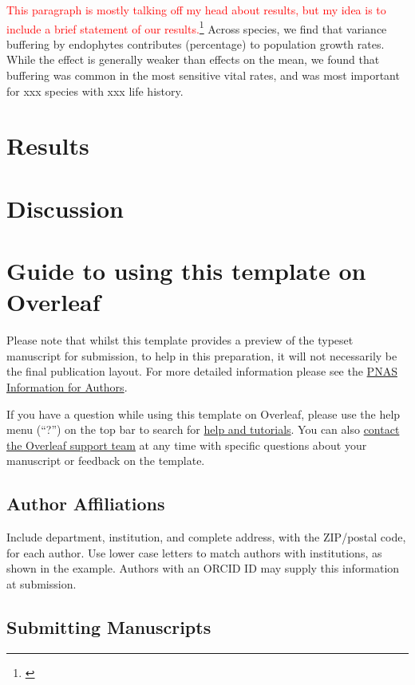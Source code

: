 \documentclass[9pt,twocolumn,twoside,lineno]{pnas-new}
\newcommand{\tom}[2]{{\color{red}{#1}}\footnote{\textit{\color{red}{#2}}}}
\begin{document}
\textcolor{red}{This paragraph is mostly talking off my head about results, but my idea is to include a brief statement of our results.\tom{}{Agree we will want a punchy summary that leaves readers wanting to continue into the Results.}}
Across species, we find that variance buffering by endophytes contributes (percentage) to population growth rates. While the effect is generally weaker than effects on the mean, we found that buffering was common in the most sensitive vital rates, and was most important for xxx species with xxx life history.


\section*{Results}

\section*{Discussion}

\section*{Guide to using this template on Overleaf}

Please note that whilst this template provides a preview of the typeset manuscript for submission, to help in this preparation, it will not necessarily be the final publication layout. For more detailed information please see the \href{http://www.pnas.org/site/authors/format.xhtml}{PNAS Information for Authors}.

If you have a question while using this template on Overleaf, please use the help menu (``?'') on the top bar to search for \href{https://www.overleaf.com/help}{help and tutorials}. You can also \href{https://www.overleaf.com/contact}{contact the Overleaf support team} at any time with specific questions about your manuscript or feedback on the template.

\subsection*{Author Affiliations}

Include department, institution, and complete address, with the ZIP/postal code, for each author. Use lower case letters to match authors with institutions, as shown in the example. Authors with an ORCID ID may supply this information at submission.

\subsection*{Submitting Manuscripts}
\end{document}
